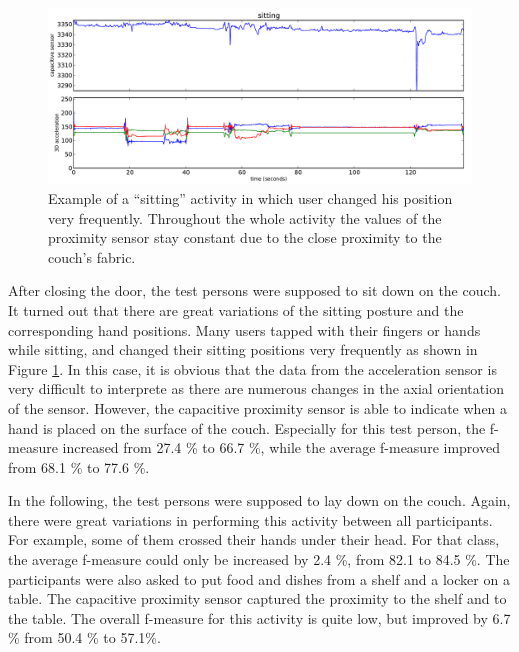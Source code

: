 \documentclass[runningheads,a4paper]{llncs}
\begin{document}
\begin{figure}
	\centering
		\includegraphics[width=1.00\textwidth]{../Auswertung/images/eugen_2.pdf}
	\caption{Example of a ``sitting'' activity in which user changed his position very frequently. Throughout the whole activity the values of the proximity sensor stay constant due to the close proximity to the couch's fabric.}
	\label{fig:eugen_2}
\end{figure}

After closing the door, the test persons were supposed to sit down on the couch. It turned out that there are great variations of the sitting posture and the corresponding hand positions. Many users tapped with their fingers or hands while sitting, and changed their sitting positions very frequently as shown in Figure \ref{fig:eugen_2}. In this case, it is obvious that the data from the acceleration sensor is very difficult to interprete as there are numerous changes in the axial orientation of the sensor. However, the capacitive proximity sensor is able to indicate when a hand is placed on the surface of the couch. Especially for this test person, the f-measure increased from 27.4 \% to 66.7 \%, while the average f-measure improved from 68.1 \% to 77.6 \%. 

In the following, the test persons were supposed to lay down on the couch. Again, there were great variations in performing this activity between all participants. For example, some of them crossed their hands under their head. For that class, the average f-measure could only be increased by 2.4 \%, from 82.1 to 84.5 \%. The participants were also asked to put food and dishes from a shelf and a locker on a table. The capacitive proximity sensor captured the proximity to the shelf and to the table. The overall f-measure for this activity is quite low, but improved by 6.7 \% from 50.4 \% to 57.1\%. 
\end{document}
